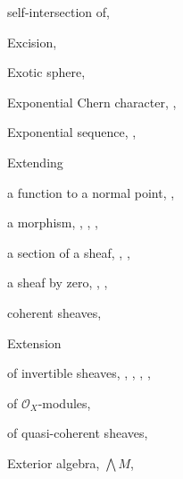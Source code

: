 {{\noindent\hspace*{7.5bp}self-intersection of, \par
\noindent\hspace*{0.0bp}Excision, \par
\noindent\hspace*{0.0bp}Exotic sphere, \par
\noindent\hspace*{0.0bp}Exponential Chern character, , \par
\noindent\hspace*{0.0bp}Exponential sequence, , \par
\noindent\hspace*{0.0bp}Extending\par
\noindent\hspace*{7.5bp}a function to a normal point, , \par
\noindent\hspace*{7.5bp}a morphism, , , , \par
\noindent\hspace*{7.5bp}a section of a sheaf, , , \par
\noindent\hspace*{7.5bp}a sheaf by zero, , , \par
\noindent\hspace*{7.5bp}coherent sheaves, \par
\noindent\hspace*{0.0bp}Extension\par
\noindent\hspace*{7.5bp}of invertible sheaves, , , , ,\par
\noindent\hspace*{15.0bp}\par
\noindent\hspace*{7.5bp}of $\mathcal O_X$-modules, \par
\noindent\hspace*{7.5bp}of quasi-coherent sheaves, \par
\noindent\hspace*{0.0bp}Exterior algebra, $\bigwedge M$, \par
}}
